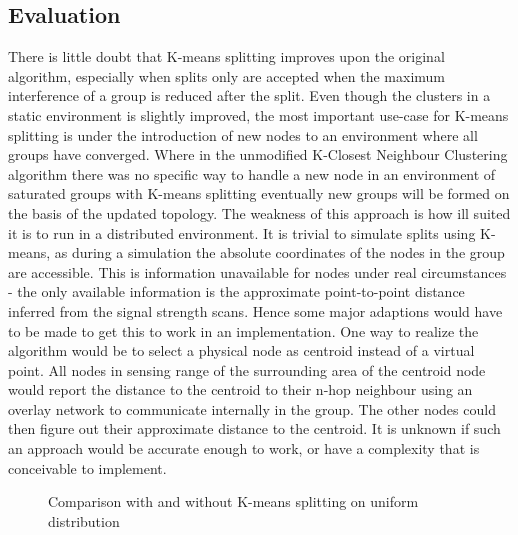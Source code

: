 \subsection{Evaluation}
There is little doubt that K-means splitting improves upon the original algorithm, especially when splits only are accepted when the maximum interference of a group is reduced after the split.
Even though the clusters in a static environment is slightly improved, the most important use-case for K-means splitting is under the introduction of new nodes to an environment
where all groups have converged. Where in the unmodified K-Closest Neighbour Clustering algorithm there was no specific way to handle a new node in an environment of saturated groups
with K-means splitting eventually new groups will be formed on the basis of the updated topology. The weakness of this approach is how ill suited it is to run in a distributed environment.
It is trivial to simulate splits using K-means, as during a simulation the absolute coordinates of the nodes in the group are accessible. This is information unavailable for nodes under
real circumstances - the only available information is the approximate point-to-point distance inferred from the signal strength scans.
Hence some major adaptions would have to be made to get this to work in an implementation.
One way to realize the algorithm would be to select a physical node as centroid instead of a virtual point. All nodes in sensing range of the surrounding area of
the centroid node would report the distance to the centroid to their n-hop neighbour using an overlay network to communicate internally in the group. The other nodes could
then figure out their approximate distance to the centroid. It is unknown if such an approach would be accurate enough to work, or have a complexity that is conceivable to implement.  

\begin{figure}
	\centering
		\qquad
		\caption{Comparison with and without K-means splitting on uniform distribution}%
		\label{fig:kmeanscomparisonuniform}%
\end{figure}


